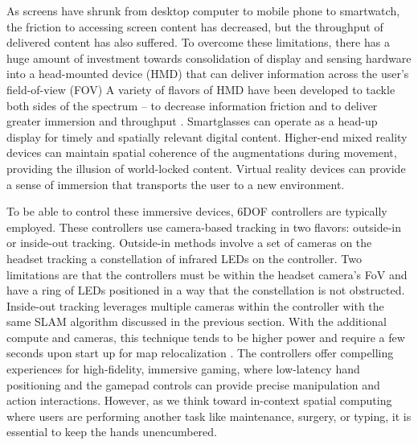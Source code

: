 \documentclass [11pt, proquest] {uwthesis}[2020/02/24]
\begin{document}
As screens have shrunk from desktop computer to mobile phone to smartwatch, the friction to accessing screen content has decreased, but the throughput of delivered content has also suffered. To overcome these limitations, there has a huge amount of investment towards consolidation of display and sensing hardware into a head-mounted device (HMD) that can deliver information across the user's field-of-view (FOV)%
A variety of flavors of HMD have been developed to tackle both sides of the spectrum -- to decrease information friction and to deliver greater immersion and throughput \cite{milgram1994taxonomy}.
Smartglasses can operate as a head-up display for timely and spatially relevant digital content. Higher-end mixed reality devices can maintain spatial coherence of the augmentations during movement, providing the illusion of world-locked content. Virtual reality devices can provide a sense of immersion that transports the user to a new environment.

To be able to control these immersive devices, 6DOF controllers are typically employed. These controllers use camera-based tracking in two flavors: outside-in or inside-out tracking. Outside-in methods involve a set of cameras on the headset tracking a constellation of infrared LEDs on the controller. Two limitations are that the controllers must be within the headset camera's FoV and have a ring of LEDs positioned in a way that the constellation is not obstructed. Inside-out tracking leverages multiple cameras within the controller with the same SLAM algorithm discussed in the previous section. With the additional compute and cameras, this technique tends to be higher power and require a few seconds upon start up for map relocalization \cite{jiang2022slam}. The controllers offer compelling experiences for high-fidelity, immersive gaming, where low-latency hand positioning and the gamepad controls can provide precise manipulation and action interactions. However, as we think toward in-context spatial computing where users are performing another task like maintenance, surgery, or typing, it is essential to keep the hands unencumbered.
\end{document}
